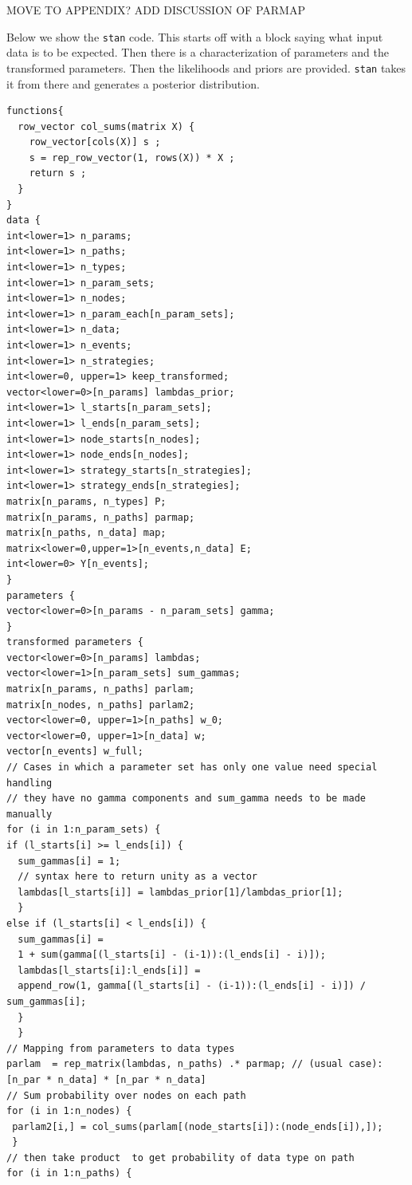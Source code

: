 \documentclass[
  article]{jss}
\begin{document}
MOVE TO APPENDIX? ADD DISCUSSION OF PARMAP

Below we show the \texttt{stan} code. This starts off with a block
saying what input data is to be expected. Then there is a
characterization of parameters and the transformed parameters. Then the
likelihoods and priors are provided. \texttt{stan} takes it from there
and generates a posterior distribution.

\begin{verbatim}
functions{
  row_vector col_sums(matrix X) {
    row_vector[cols(X)] s ;
    s = rep_row_vector(1, rows(X)) * X ;
    return s ;
  }
}
data {
int<lower=1> n_params;
int<lower=1> n_paths;
int<lower=1> n_types;
int<lower=1> n_param_sets;
int<lower=1> n_nodes;
int<lower=1> n_param_each[n_param_sets];
int<lower=1> n_data;
int<lower=1> n_events;
int<lower=1> n_strategies;
int<lower=0, upper=1> keep_transformed;
vector<lower=0>[n_params] lambdas_prior;
int<lower=1> l_starts[n_param_sets];
int<lower=1> l_ends[n_param_sets];
int<lower=1> node_starts[n_nodes];
int<lower=1> node_ends[n_nodes];
int<lower=1> strategy_starts[n_strategies];
int<lower=1> strategy_ends[n_strategies];
matrix[n_params, n_types] P;
matrix[n_params, n_paths] parmap;
matrix[n_paths, n_data] map;
matrix<lower=0,upper=1>[n_events,n_data] E;
int<lower=0> Y[n_events];
}
parameters {
vector<lower=0>[n_params - n_param_sets] gamma;
}
transformed parameters {
vector<lower=0>[n_params] lambdas;
vector<lower=1>[n_param_sets] sum_gammas;
matrix[n_params, n_paths] parlam;
matrix[n_nodes, n_paths] parlam2;
vector<lower=0, upper=1>[n_paths] w_0;
vector<lower=0, upper=1>[n_data] w;
vector[n_events] w_full;
// Cases in which a parameter set has only one value need special handling
// they have no gamma components and sum_gamma needs to be made manually
for (i in 1:n_param_sets) {
if (l_starts[i] >= l_ends[i]) {
  sum_gammas[i] = 1;
  // syntax here to return unity as a vector
  lambdas[l_starts[i]] = lambdas_prior[1]/lambdas_prior[1];
  }
else if (l_starts[i] < l_ends[i]) {
  sum_gammas[i] =
  1 + sum(gamma[(l_starts[i] - (i-1)):(l_ends[i] - i)]);
  lambdas[l_starts[i]:l_ends[i]] =
  append_row(1, gamma[(l_starts[i] - (i-1)):(l_ends[i] - i)]) / sum_gammas[i];
  }
  }
// Mapping from parameters to data types
parlam  = rep_matrix(lambdas, n_paths) .* parmap; // (usual case): [n_par * n_data] * [n_par * n_data]
// Sum probability over nodes on each path
for (i in 1:n_nodes) {
 parlam2[i,] = col_sums(parlam[(node_starts[i]):(node_ends[i]),]);
 }
// then take product  to get probability of data type on path
for (i in 1:n_paths) {

\end{verbatim}
\end{document}
